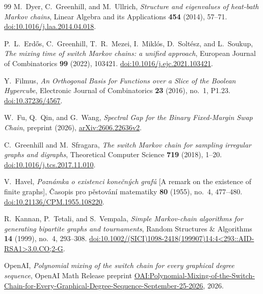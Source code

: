 \begin{thebibliography}{99}
M.~Dyer, C.~Greenhill, and M.~Ullrich,
\emph{Structure and eigenvalues of heat-bath Markov chains},
Linear Algebra and its Applications \textbf{454} (2014), 57--71.
\href{https://doi.org/10.1016/j.laa.2014.04.018}{doi:10.1016/j.laa.2014.04.018}.

P.~L.~Erd\H{o}s, C.~Greenhill, T.~R.~Mezei, I.~Mikl\'os,
D.~Solt\'esz, and L.~Soukup,
\emph{The mixing time of switch Markov chains: a unified approach},
European Journal of Combinatorics \textbf{99} (2022), 103421.
\href{https://doi.org/10.1016/j.ejc.2021.103421}{doi:10.1016/j.ejc.2021.103421}.

Y.~Filmus,
\emph{An Orthogonal Basis for Functions over a Slice of the Boolean Hypercube},
Electronic Journal of Combinatorics \textbf{23} (2016), no.~1, P1.23.
\href{https://doi.org/10.37236/4567}{doi:10.37236/4567}.

W.~Fu, Q.~Qin, and G.~Wang,
\emph{Spectral Gap for the Binary Fixed-Margin Swap Chain},
preprint (2026), \href{https://arxiv.org/abs/2606.22636v2}{arXiv:2606.22636v2}.

C.~Greenhill and M.~Sfragara,
\emph{The switch Markov chain for sampling irregular graphs and digraphs},
Theoretical Computer Science \textbf{719} (2018), 1--20.
\href{https://doi.org/10.1016/j.tcs.2017.11.010}{doi:10.1016/j.tcs.2017.11.010}.

V.~Havel,
\emph{Pozn\'amka o existenci kone\v{c}n\'ych graf\r{u}}
[A remark on the existence of finite graphs],
\v{C}asopis pro p\v{e}stov\'an\'i matematiky
\textbf{80} (1955), no.~4, 477--480.
\href{https://doi.org/10.21136/CPM.1955.108220}{doi:10.21136/CPM.1955.108220}.

R.~Kannan, P.~Tetali, and S.~Vempala,
\emph{Simple Markov-chain algorithms for generating bipartite graphs and tournaments},
Random Structures \& Algorithms \textbf{14} (1999), no.~4, 293--308.
\href{https://doi.org/10.1002/(SICI)1098-2418(199907)14:4\%3C293::AID-RSA1\%3E3.0.CO;2-G}{doi:10.1002/(SICI)1098-2418(199907)14:4\textless293::AID-RSA1\textgreater3.0.CO;2-G}.

OpenAI,
\emph{Polynomial mixing of the switch chain for every graphical degree sequence},
OpenAI Math Release preprint
\href{https://github.com/openai/math/tree/adc7f1241b42e322a6451854ab7e4b4c146bf78a/preprints/Polynomial-Mixing-of-the-Switch-Chain-for-Every-Graphical-Degree-Sequence-September-25-2026/build}{OAI:Polynomial-Mixing-of-the-Switch-Chain-for-Every-Graphical-Degree-Sequence-September-25-2026},
2026.


\end{thebibliography}
